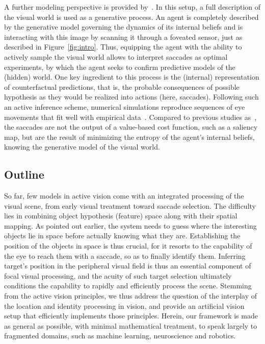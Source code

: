 %
A further modeling perspective is provided by~\cite{Friston12}. In this setup, a full description of the visual world is used as a generative process. An agent is completely described by the generative model governing the dynamics of its internal beliefs and is interacting with this image by scanning it through a foveated sensor, just as described in Figure~\ref{fig:intro}. Thus, equipping the agent with the ability to actively sample the visual world allows to interpret saccades as optimal experiments, by which the agent seeks to confirm predictive models of the (hidden) world. One key ingredient to this process is the (internal) representation of counterfactual predictions, that is, the probable consequences of possible hypothesis as they would be realized into actions (here, saccades). Following such an active inference scheme, numerical simulations reproduce sequences of eye movements that fit well with empirical data~\cite{Mirza18}. Compared to previous studies as~\cite{Najemnik05}, the saccades are not the output of a value-based cost function, such as a saliency map, but are the result of minimizing the entropy of the agent's internal beliefs, knowing the generative model of the visual world.
%
\subsection{Outline}
%

So far, few models in active vision come with an integrated processing of the visual scene, from early visual treatment toward saccade selection. The difficulty lies in combining object hypothesis (feature) space along with their spatial mapping. As pointed out earlier, the system needs to guess where the interesting objects lie in space before actually knowing what they are. Establishing the position of the objects in space is thus crucial, for it resorts to the capability of the eye to reach them with a saccade, so as to finally identify them. Inferring target's position in the peripheral visual field is thus an essential component of focal visual processing, and the acuity of such target selection ultimately conditions the capability to rapidly and efficiently process the scene. Stemming from the active vision principles, we thus address the question of the interplay of the location and identity processing in vision, and provide an artificial vision setup that efficiently implements those principles. %
Herein, our framework is made as general as possible, with minimal mathematical treatment, to speak largely to fragmented domains, such as machine learning, neuroscience and robotics.


